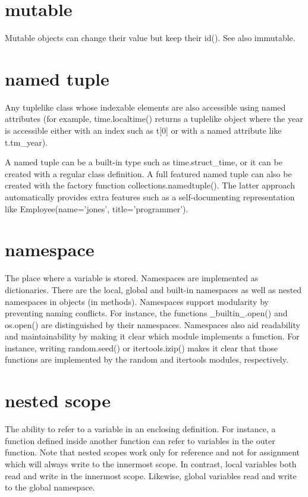 \documentclass[12pt,a4paper,final,twoside,onecolumn,titlepage]{book}
\begin{document}
\section{mutable}
Mutable objects can change their value but keep their id(). See also immutable.

\section{named tuple}
Any tuple\-like class whose indexable elements are also accessible using named attributes (for example, time.localtime() returns a tuple\-like object where the year is accessible either with an index such as t[0] or with a named attribute like t.tm\_year).

A named tuple can be a built-in type such as time.struct\_time, or it can be created with a regular class definition. A full featured named tuple can also be created with the factory function collections.namedtuple(). The latter approach automatically provides extra features such as a self-documenting representation like Employee(name='jones', title='programmer').

\section{namespace}
The place where a variable is stored. Namespaces are implemented as dictionaries. There are the local, global and built-in namespaces as well as nested namespaces in objects (in methods). Namespaces support modularity by preventing naming conflicts. For instance, the functions $\_\_$builtin$\_\_$.open() and os.open() are distinguished by their namespaces. Namespaces also aid readability and maintainability by making it clear which module implements a function. For instance, writing random.seed() or itertools.izip() makes it clear that those functions are implemented by the random and itertools modules, respectively.

\section{nested scope}
The ability to refer to a variable in an enclosing definition. For instance, a function defined inside another function can refer to variables in the outer function. Note that nested scopes work only for reference and not for assignment which will always write to the innermost scope. In contrast, local variables both read and write in the innermost scope. Likewise, global variables read and write to the global namespace.
\end{document}
